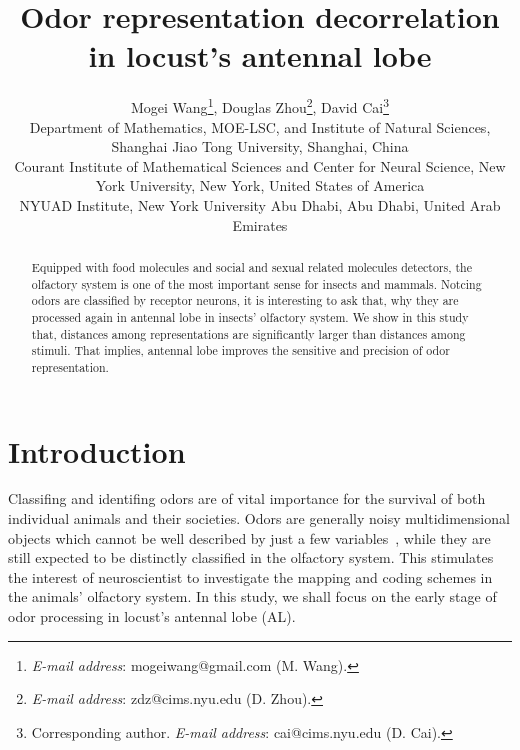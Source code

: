 \documentclass[12pt, a4paper]{article}
\begin{document}
\newcommand{\lr}[1]{\langle #1 \rangle}
\newcommand{\llr}[1]{\langle \hspace{-2.5pt} \langle #1 \rangle \hspace{-2.5pt} \rangle}

\title{Odor representation decorrelation in locust's antennal lobe}
\author{
Mogei Wang\footnote{\emph{E-mail address}: mogeiwang@gmail.com (M. Wang).},
Douglas Zhou\footnote{\emph{E-mail address}: zdz@cims.nyu.edu (D. Zhou).},
David Cai\footnote{Corresponding author. \emph{E-mail address}: cai@cims.nyu.edu (D. Cai).}
\\{\tiny{
    Department of Mathematics, MOE-LSC, and Institute of Natural Sciences, Shanghai Jiao Tong University, Shanghai, China}} \vspace{-3mm} \\{\tiny{
    Courant Institute of Mathematical Sciences and Center for Neural Science, New York University, New York, United States of America}} \vspace{-3mm} \\{\tiny{
    NYUAD Institute, New York University Abu Dhabi, Abu Dhabi, United Arab Emirates
}} } \date{} \maketitle \vspace{-10mm}

\begin{abstract} \footnotesize
  Equipped with food molecules and social and sexual related molecules detectors, the olfactory system is one of the most important sense for insects and mammals. Notcing odors are classified by receptor neurons, it is interesting to ask that, why they are processed again in antennal lobe in insects' olfactory system. We show in this study that, distances among representations are significantly larger than distances among stimuli.
  That implies, antennal lobe improves the sensitive and precision of odor representation.
\end{abstract}

\section{Introduction}

Classifing and identifing odors are of vital importance for the survival of both individual animals and their societies. Odors are generally noisy multidimensional objects which cannot be well described by just a few variables~\citep{Wilson2006}, while they are still expected to be distinctly classified in the olfactory system. This stimulates the interest of neuroscientist to investigate the mapping and coding schemes in the animals' olfactory system. In this study, we shall focus on the early stage of odor processing in locust's antennal lobe (AL).
\end{document}

